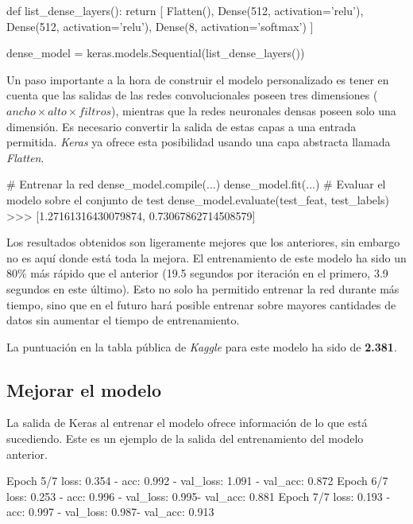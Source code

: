 \begin{python}
def list_dense_layers():
    return [
        Flatten(),
        Dense(512, activation='relu'),
        Dense(512, activation='relu'),
        Dense(8, activation='softmax')
    ]

dense_model = keras.models.Sequential(list_dense_layers())
\end{python}

Un paso importante a la hora de construir el modelo personalizado es tener en cuenta que las salidas de las redes convolucionales poseen tres dimensiones ($ancho \times alto \times filtros$), mientras que la redes neuronales densas poseen solo una dimensión. Es necesario convertir la salida de estas capas a una entrada permitida. \textit{Keras} ya ofrece esta posibilidad usando una capa abstracta llamada \textit{Flatten}.

\begin{python}
# Entrenar la red
dense_model.compile(...)
dense_model.fit(...)
# Evaluar el modelo sobre el conjunto de test
dense_model.evaluate(test_feat, test_labels)
>>> [1.27161316430079874, 0.73067862714508579]
\end{python}

Los resultados obtenidos son ligeramente mejores que los anteriores, sin embargo no es aquí donde está toda la mejora. El entrenamiento de este modelo ha sido un 80\% más rápido que el anterior (19.5 segundos por iteración en el primero, 3.9 segundos en este último). Esto no solo ha permitido entrenar la red durante más tiempo, sino que en el futuro hará posible entrenar sobre mayores cantidades de datos sin aumentar el tiempo de entrenamiento.

La puntuación en la tabla pública de \textit{Kaggle} para este modelo ha sido
de \textbf{2.381}.

\subsection{Mejorar el modelo}

La salida de Keras al entrenar el modelo ofrece información de lo que está sucediendo. Este es un ejemplo de la salida del entrenamiento del modelo anterior.

\begin{python}
Epoch 5/7
loss: 0.354 - acc: 0.992 - val_loss: 1.091 - val_acc: 0.872
Epoch 6/7
loss: 0.253 - acc: 0.996 - val_loss: 0.995- val_acc: 0.881
Epoch 7/7
loss: 0.193 - acc: 0.997 - val_loss: 0.987- val_acc: 0.913
\end{python}

